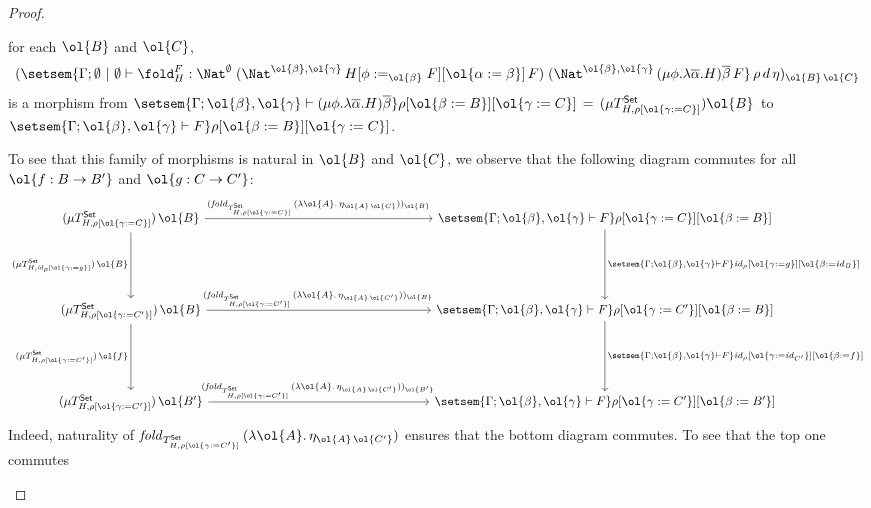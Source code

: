 \documentclass[acmsmall,review,anonymous]{acmart}
\theoremstyle{definition}
\newcommand{\set}{\mathsf{Set}}
\renewcommand{\id}{\mathit{id}}
\begin{document}
\begin{proof}
\begin{itemize}
for each $\ol{B}$ and $\ol{C}$,
\[(\setsem{\Gamma; \emptyset~|~\emptyset \vdash \fold^F_H :
  \Nat^\emptyset\;(\Nat^{\ol{\beta}, \ol{\gamma}}\,H[\phi
    :=_{\ol{\beta}} F][\ol{\alpha := \beta}]\,F)\;
  (\Nat^{{\ol{\beta},\ol{\gamma}} }\,(\mu \phi.\lambda \overline
  \alpha.H)\overline \beta\,F}\,\rho\,d\,\eta)_{\ol{B}\,\ol{C}}\] is a
morphism from
$\setsem{\Gamma; \ol{\beta},\ol{\gamma} \vdash (\mu
  \phi.\lambda \overline \alpha.H)\overline \beta}\rho[\ol{\beta :=
    B}][\ol{\gamma := C}]\,=\, (\mu T^\set_{H,\rho[\ol{\gamma := C}]})
\ol{B}$ to\\ $\setsem{\Gamma;\ol{\beta},\ol{\gamma} \vdash
  F}\rho[\ol{\beta := B}][\ol{\gamma := C}]$.

To see that this family of morphisms is natural in $\ol{B}$ and
$\ol{C}$, we observe that the following diagram commutes for all
$\ol{f : B \to B'}$ and $\ol{g : C \to C'}$:
{\tiny
\[\begin{tikzcd}[column sep=2.5in, row sep=0.75in]
(\mu T^\set_{H,\rho[\ol{\gamma := C}]})\, \ol{B}
\ar[d, "{(\mu T^\set_{H,\id_\rho[\ol{\gamma := g}]}) \, \ol{B}}"'] \ar[r, 
  "{(\mathit{fold}_{T^\set_{H,\rho[\ol{\gamma := C}]}}\,(\lambda
    \ol{A}.\,\eta_{\ol{A}\,\ol{C}}))_{\ol{B}}}"] 
& \setsem{\Gamma; \ol{\beta},\ol{\gamma} \vdash F}\rho[\ol{\gamma :=
    C}][\ol{\beta := B}]\ar[d, "{\setsem{\Gamma;
      \ol{\beta},\ol{\gamma} \vdash F}\id_\rho[\ol{\gamma := 
    g}][\ol{\beta := \id_B}]}"]\\
(\mu T^\set_{H,\rho[\ol{\gamma := C'}]})\, \ol{B} 
\ar[r,"{(\mathit{fold}_{T^\set_{H,\rho[\ol{\gamma :=
            C'}]}}\,(\lambda \ol{A}.\,\eta_{\ol{A}\,\ol{C'}}))_{\ol{B}}\,}" ] 
\ar[d, "{(\mu T^\set_{H,\rho[\ol{\gamma := C'}]}) \, \ol{f}}"'] & 
 \setsem{\Gamma; \ol{\beta},\ol{\gamma} \vdash F}\rho[\ol{\gamma :=
    C'}][\ol{\beta := B}]\ar[d, "{\setsem{\Gamma;
      \ol{\beta},\ol{\gamma} \vdash F}\id_\rho[\ol{\gamma := 
    \id_{C'}}][\ol{\beta := f}]}"]\\
 (\mu T^\set_{H,\rho[\ol{\gamma := C'}]})\, \ol{B'} 
\ar[r,"{(\mathit{fold}_{T^\set_{H,\rho[\ol{\gamma :=
            C'}]}}\,(\lambda \ol{A}.\,\eta_{\ol{A}\,\ol{C'}}))_{\ol{B'}}\,}"
] &  
 \setsem{\Gamma; \ol{\beta},\ol{\gamma} \vdash F}\rho[\ol{\gamma :=
    C'}][\ol{\beta := B'}]
\end{tikzcd}\]}
Indeed, naturality of $\mathit{fold}_{T^\set_{H,\rho[\ol{\gamma :=
        C'}]}}\,(\lambda \ol{A}.\,\eta_{\ol{A}\,\ol{C'}})$ ensures that
the bottom diagram commutes. To see that the top one commutes

\end{itemize}
\end{proof}
\end{document}
